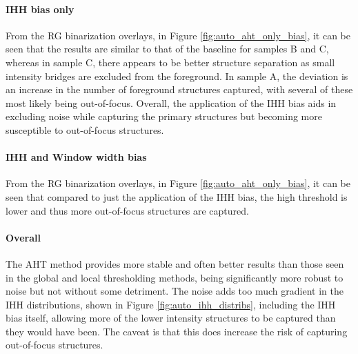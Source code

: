 \paragraph{IHH bias only} From the RG binarization overlays, in Figure \ref{fig:auto_aht_only_bias}, it can be seen that the results are similar to that of the baseline for samples B and C, whereas in sample C, there appears to be better structure separation as small intensity bridges are excluded from the foreground. In sample A, the deviation is an increase in the number of foreground structures captured, with several of these most likely being out-of-focus. Overall, the application of the IHH bias aids in excluding noise while capturing the primary structures but becoming more susceptible to out-of-focus structures.
\paragraph{IHH and Window width bias} From the RG binarization overlays, in Figure \ref{fig:auto_aht_only_bias}, it can be seen that compared to just the application of the IHH bias, the high threshold is lower and thus more out-of-focus structures are captured.

\paragraph{Overall} The AHT method provides more stable and often better results than those seen in the global and local thresholding methods, being significantly more robust to noise but not without some detriment. The noise adds too much gradient in the IHH distributions, shown in Figure \ref{fig:auto_ihh_distribs}, including the IHH bias itself, allowing more of the lower intensity structures to be captured than they would have been. The caveat is that this does increase the risk of capturing out-of-focus structures.

